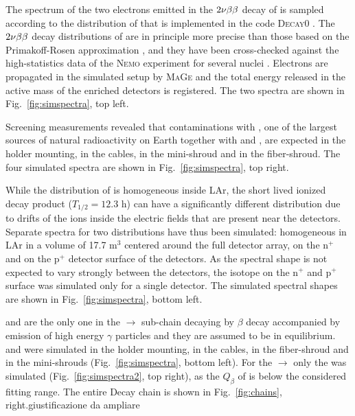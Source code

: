 \marginnote{$2\nbb$} The spectrum of the two electrons emitted in the $2\nbb$ decay of  is sampled according to the distribution of \cite{tables2nbb} that is implemented in the code \textsc{Decay0} \cite{decay0}. The $2\nbb$ decay distributions of \cite{tables2nbb} are in principle more precise than those based on the Primakoff-Rosen approximation \cite{PrimakoffRosen}, and they have been cross-checked against the high-statistics data of the \textsc{Nemo} experiment for several nuclei \cite{nemo1,nemo2,nemo3,nemo4,nemo5}. Electrons are propagated in the {\gerda} simulated setup by \textsc{MaGe} and the total energy released in the active mass of the enriched detectors is registered. The two spectra are shown in Fig.~\ref{fig:simspectra}, top left.

 Screening measurements revealed that contaminations with , one of the largest sources of natural radioactivity on Earth together with  and , are expected in the holder mounting, in the cables, in the mini-shroud and in the fiber-shroud. The four simulated spectra are shown in Fig.~\ref{fig:simspectra}, top right.

 While the distribution of  is homogeneous inside LAr, the short lived ionized decay product  ($T_{1/2} = 12.3$ h) can have a significantly different distribution due to drifts of the  ions inside the electric fields that are present near the detectors. Separate spectra for two  distributions have thus been simulated: homogeneous in LAr in a volume of 17.7 m$^3$ centered around the full detector array, on the n$^+$ and on the p$^+$ detector surface of the detectors. As the spectral shape is not expected to vary strongly between the detectors, the isotope on the n$^+$ and p$^+$ surface was simulated only for a single detector. The simulated spectral shapes are shown in Fig.~\ref{fig:simspectra}, bottom left.

  and  are the only one in the  $\rightarrow$  sub-chain decaying by $\beta$ decay accompanied by emission of high energy $\gamma$ particles and they are assumed to be in equilibrium.  and  were simulated in the holder mounting, in the cables, in the fiber-shroud and in the mini-shrouds (Fig.~\ref{fig:simspectra}, bottom left). For the  $\rightarrow$  only the  was simulated (Fig.~\ref{fig:simspectra2}, top right), as the $Q_\beta$ of  is below the considered fitting range. The entire  Decay chain is shown in Fig.~\ref{fig:chains}, right.{\color{red}giustificazione da ampliare}


